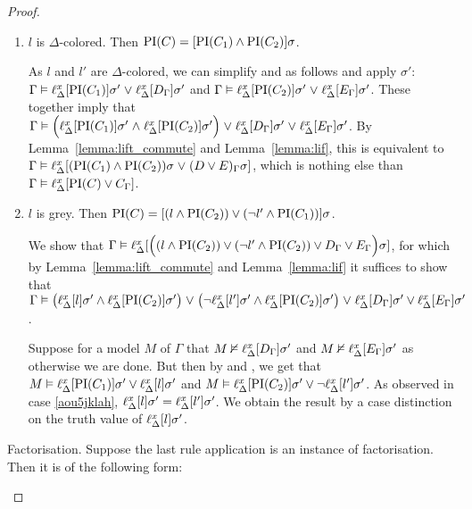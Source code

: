 \begin{proof}
\begin{description}
\begin{enumerate}
				\item $l$ is $\Delta$-colored. Then $\operatorname{PI}(C) = [\operatorname{PI}(C_1) \land \operatorname{PI}(C_2)]\sigma$.

					As $l$ and $l'$ are $\Delta$-colored, we can simplify \markA{} and \markB{} as follows and apply $\sigma'$:
					$\Gamma \vDash \ell_{\Delta}^{x}[\operatorname{PI}(C_1)]\sigma' \;{\lor}\; \ell_{\Delta}^{x}[D_\Gamma]\sigma' $ and $\Gamma \vDash \ell_{\Delta}^{x}[\operatorname{PI}(C_2)]\sigma' \;{\lor}\; \ell_{\Delta}^{x}[E_\Gamma]\sigma'$.
					These together imply that 
					$\Gamma \vDash \Big(\ell_{\Delta}^{x}[\operatorname{PI}(C_1)]\sigma' \;{\land}\; \ell_{\Delta}^{x}[\operatorname{PI}(C_2)]\sigma'\Big) \;{\lor}\;\allowbreak \ell_{\Delta}^{x}[D_\Gamma]\sigma' \;{\lor}\;\allowbreak \ell_{\Delta}^{x}[E_\Gamma]\sigma'$.
					By Lemma~\ref{lemma:lift_commute} and Lemma~\ref{lemma:lif}, this is equivalent to 
					$\Gamma \vDash \ell_{\Delta}^{x}[(\operatorname{PI}(C_1) \land \operatorname{PI}(C_2))\sigma \;{\lor}\; (D \lor E)_\Gamma\sigma]$, which is nothing else than
					$\Gamma \vDash \ell_{\Delta}^{x}[\operatorname{PI}(C) \lor C_\Gamma]$.

				\item $l$ is grey. Then $\operatorname{PI}(C) = [(l \land \operatorname{PI}(C_2) ) \lor (\lnot l' \land \operatorname{PI}(C_1))]\sigma$.

					We show that $\Gamma \vDash\allowbreak \ell_{\Delta}^{x}[ \Big((l \land \operatorname{PI}(C_2) ) \lor\allowbreak (\lnot l' \land \operatorname{PI}(C_2)) \lor D_\Gamma \lor E_\Gamma\Big)\sigma]$, for which by Lemma~\ref{lemma:lift_commute} and Lemma~\ref{lemma:lif} it suffices to show that 
					$\Gamma \vDash\allowbreak \big(\ell_{\Delta}^{x}[l]\sigma' \land \ell_{\Delta}^{x}[\operatorname{PI}(C_2)]\sigma'\big)\;{\lor}\;\allowbreak \big(\lnot \ell_{\Delta}^{x}[l']\sigma' \land \ell_{\Delta}^{x}[\operatorname{PI}(C_2)]\sigma'\big)\;{\lor}\;\allowbreak \ell_{\Delta}^{x}[D_\Gamma]\sigma' \lor \ell_{\Delta}^{x}[E_\Gamma]\sigma'$.

					Suppose for a model $M$ of $\Gamma$ that  $M \nvDash \ell_{\Delta}^{x}[D_\Gamma]\sigma'$ and $M\nvDash \ell_{\Delta}^{x}[E_\Gamma]\sigma'$ as otherwise we are done.
					But then by \markA{} and \markB{}, we get that 
					$M \vDash \ell_{\Delta}^{x}[\operatorname{PI}(C_1)]\sigma' \lor \ell_{\Delta}^{x}[l]\sigma'$ and
					$M \entails\nolinebreak \lifdelta{\PI(C_2)}\sigma' \lor \lnot\lifdelta{l'}\sigma'$.
					As observed in case \ref{aou5jklah}, $\ell_{\Delta}^{x}[l]\sigma' = \ell_{\Delta}^{x}[l']\sigma'$.
					We obtain the result by a case distinction on the truth value of $\ell_{\Delta}^{x}[l]\sigma'$.

			\end{enumerate}

		\item{Factorisation.}
			Suppose the last rule application is an instance of factorisation. Then it is of the following form:
			\begin{prooftree}
			\end{prooftree}


\end{description}
\end{proof}
